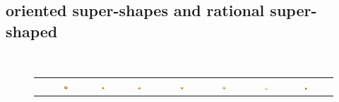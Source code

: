 \subsection{oriented super-shapes and rational super-shaped} ~\\
\begin{figure}[htb]
\begingroup
\setlength{\tabcolsep}{1pt}
\def\arraystretch{0.4}%
\begin{tabular}{ccccccccc}
    & \includegraphics[width=0.12\textwidth]{../images/form_factor/supershapes/SuperShape3D5_0_30_20_20_1_1__7_0p38_75_20_20_1_1.png}
    & \includegraphics[width=0.12\textwidth]{../images/form_factor/supershapes/SuperShape3D6_0_100_40_40_1_1__8_0p4_200_40_40_1_1__a1b1c1p5.png}
    & \includegraphics[width=0.12\textwidth]{../images/form_factor/supershapes/SuperShape3D1p5_0_2_12_12_1_1__4_0_2_2_2_1_1__a3b1c3.png}
    & \includegraphics[width=0.12\textwidth]{../images/form_factor/supershapes/SuperShape3D3_0_1_6_6_1_1__4_0_2_2_2_1_1.png}
    & \includegraphics[width=0.12\textwidth]{../images/form_factor/supershapes/SuperShape3D5_0_1_6_6_1_1__4_0_2_2_2_1_1.png}
    & \includegraphics[width=0.12\textwidth]{../images/form_factor/supershapes/SuperShape3D7p3_0_5_5_5_5_1__4_0_5_5_5_6_2.png}
    & \includegraphics[width=0.12\textwidth]{../images/form_factor/supershapes/SuperShape3D4_0_2_2_2_1_1__24_0_2_8_8_1_1__a1b1c1.png}

\end{tabular}
\end{figure}
